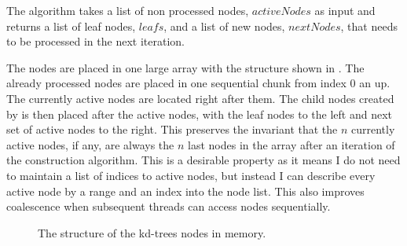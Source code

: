 \begin{algorithm}
\begin{algorithmic}
{                 \STATE{}

                   \ENDFOR
                 \ENDFOR
  }
  \end{algorithmic}
\end{algorithm}


The algorithm takes a list of non processed nodes, $activeNodes$ as
input and returns a list of leaf nodes, $leafs$, and a list of new
nodes, $nextNodes$, that needs to be processed in the next iteration.


The nodes are placed in one large array with the structure shown in
. The already processed nodes are placed in
one sequential chunk from index 0 an up. The currently active nodes
are located right after them. The child nodes created by  is
then placed after the active nodes, with the leaf nodes to the left
and next set of active nodes to the right. This preserves the
invariant that the $n$ currently active nodes, if any, are always the
$n$ last nodes in the array after an iteration of the construction
algorithm. This is a desirable property as it means I do not need to
maintain a list of indices to active nodes, but instead I can describe
every active node by a range and an index into the node list. This
also improves coalescence when subsequent threads can access nodes
sequentially.


\begin{figure}
  \centering
  \caption{The structure of the kd-trees nodes in memory.}
  \label{fig:nodeStructure}
\end{figure}

